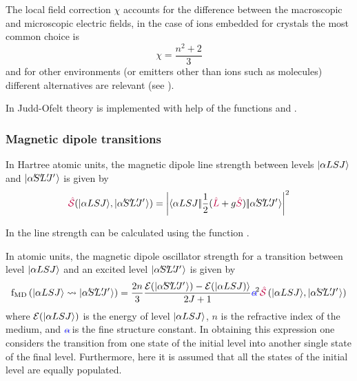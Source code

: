 \documentclass[11pt, twoside,openright]{article}
\begin{document}
The local field correction $\chi$ accounts for the difference between the macroscopic and microscopic electric fields, in the case of ions embedded for crystals the most common choice is 
\begin{equation}
	\chi = \frac{n^2+2}{3}  
\end{equation}
and for other environments (or emitters other than ions such as molecules) different alternatives are relevant (see \cite{duan_dependence_2006}).

In \qlanth Judd-Ofelt theory is implemented with help of the functions  and .

 

 

\subsubsection{Magnetic dipole transitions}

In Hartree atomic units, the magnetic dipole line strength between levels $|\alpha{LSJ}\rangle$ and $\ket{\alpha\mathrlap{'} S\mathrlap{'} L\mathrlap{'} J\mathrlap{'}\,\,}$ is given by
\begin{equation} 
	\lineStrength(\ket{\alpha{LSJ}},\ket{\alpha\mathrlap{'} S\mathrlap{'} L\mathrlap{'} J\mathrlap{'}\,\,}) = 
	\left|\redbraopket{\alpha{LSJ}}{\frac{1}{2}(\op{L}+g \op{S})}{\alpha\mathrlap{'} S\mathrlap{'} L\mathrlap{'} J\mathrlap{'}\,\,} \right|^2
\end{equation}

In \qlanth the line strength can be calculated using the function .

 

In atomic units, the magnetic dipole oscillator strength for a transition between level $|\alpha{LSJ}\rangle$ and an excited level $\ket{\alpha\mathrlap{'} S\mathrlap{'} L\mathrlap{'} J\mathrlap{'}\,\,}$ is given by \cite{rudzikas_theoretical_2007}
\begin{equation} 
	\oStrength{MD}{\alpha{LSJ}}{\alpha\mathrlap{'} S\mathrlap{'} L\mathrlap{'} J\mathrlap{'}\,\,} = \frac{2 n}{3}
	\frac{
	\mathcal{E}(
		\ket{\alpha\mathrlap{'}
			S\mathrlap{'}
			L\mathrlap{'}
			J\mathrlap{'}\,\,})-
	\mathcal{E}(
		\ket{\alpha{LSJ}
		)}}
	{2J+1}
	\alphaFine^2
	\lineStrength\left(\ket{\alpha{LSJ}},\ket{\alpha\mathrlap{'} S\mathrlap{'} L\mathrlap{'} J\mathrlap{'}\,\,}\right)
\end{equation}
where $\mathcal{E}(|\alpha{LSJ}\rangle)$ is the energy of level $|\alpha{LSJ}\rangle$, $n$ is the refractive index of the medium, and $\alphaFine$ is the fine structure constant. In obtaining this expression one considers the transition from one state of the initial level into another single state of the final level. Furthermore, here it is assumed that all the states of the initial level are equally populated.
\end{document}
